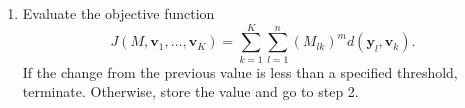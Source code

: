 \documentclass[a4paper, fontsize=12pt]{article}
\newcommand{\ddeg}{^{\circ}}
\begin{document}
\begin{appendices}
\begin{algorithm}[H]
\begin{enumerate}
	\item Evaluate the objective function
	\[
	J(M,\bm{v}_1, \hdots, \bm{v}_K) = \sum_{k=1}^{K}{\sum_{l=1}^n\left(M_{lk}\right)^m d(\bm{y}_l, \bm{v}_k)}.
	\]
	If the change from the previous value is less than a specified threshold, terminate. Otherwise, store the value and go to step 2. 
	
\end{enumerate}
\label{alg:fcc}
\end{algorithm}

%
%
%
%
%
%
%
%
%
%

\end{appendices}
\end{document}
